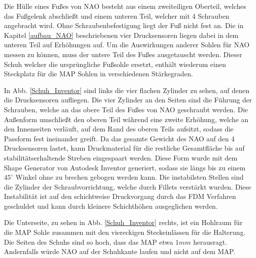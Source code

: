Die Hülle eines Fußes von NAO besteht aus einem zweiteiligen Oberteil, welches das Fußgelenk abschließt und einem unteren Teil, welcher mit 4 Schrauben angebracht wird. Ohne Schraubenbefestigung liegt der Fuß nicht fest an. Die in Kapitel \ref{aufbau_NAO} beschriebenen vier Drucksensoren liegen dabei in dem unteren Teil auf Erhöhungen auf. Um die Auswirkungen anderer Sohlen für NAO messen zu können, muss der untere Teil des Fußes ausgetauscht werden. Dieser 	\glqq Schuh\grqq{} welcher die ursprüngliche Fußsohle ersetzt, enthält wiederum einen Steckplatz für die MAP Sohlen in verschiedenen Stärkegraden. 

In Abb. \ref{Schuh_Inventor} sind links die vier flachen Zylinder zu sehen, auf denen die Drucksensoren aufliegen. Die vier Zylinder an den Seiten sind die Führung der Schrauben, welche an das obere Teil des Fußes von NAO geschraubt werden. Die Außenform umschließt den oberen Teil während eine zweite Erhöhung, welche an den Innenseiten verläuft, auf dem Rand des oberen Teils aufsitzt, sodass die Passform fest ineinander greift. Da das gesamte Gewicht des NAO auf den 4 Drucksensoren lastet, kann Druckmaterial für die restliche Gesamtfläche bis auf stabilitätserhaltende Streben eingespaart werden. Diese Form wurde mit dem Shape Generator von Autodesk Inventor generiert, sodass sie längs bis zu einem $45^\circ$ Winkel ohne zu brechen gebogen werden kann. Die instabilsten Stellen sind die Zylinder der Schraubvorrichtung, welche durch Fillets verstärkt wurden. Diese Instabilität ist auf den schichtweise Druckvorgang durch das FDM Verfahren geschuldet und kann durch kleinere Schichthöhen ausgeglichen werden.

Die Unterseite, zu sehen in Abb. \ref{Schuh_Inventor} rechts, ist ein Hohlraum für die MAP Sohle zusammen mit den viereckigen Steckeinlässen für die Halterung. Die Seiten des Schuhs sind so hoch, dass das MAP etwa $1 \unit{mm}$ herausragt. Andernfalls würde NAO auf der Schuhkante laufen und nicht auf dem MAP.  

